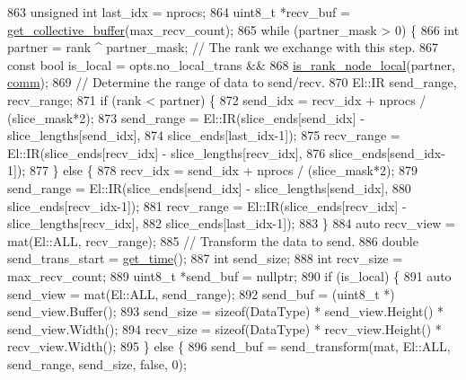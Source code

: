 \begin{DoxyCode}
863   \textcolor{keywordtype}{unsigned} \textcolor{keywordtype}{int} last\_idx = nprocs;
864   uint8\_t *recv\_buf = \hyperlink{classlbann_1_1lbann__comm_ae925ac5eaf2895717c709b252961b3bf}{get\_collective\_buffer}(max\_recv\_count);
865   \textcolor{keywordflow}{while} (partner\_mask > 0) \{
866     \textcolor{keywordtype}{int} partner = rank ^ partner\_mask;  \textcolor{comment}{// The rank we exchange with this step.}
867     \textcolor{keyword}{const} \textcolor{keywordtype}{bool} is\_local = opts.no\_local\_trans &&
868                           \hyperlink{classlbann_1_1lbann__comm_a5cdd318d1505ba0f31bf4fe9fadffacc}{is\_rank\_node\_local}(partner, \hyperlink{file__io_8cpp_ab048c6f9fcbcfaa57ce68b00263dbebe}{comm});
869     \textcolor{comment}{// Determine the range of data to send/recv.}
870     El::IR send\_range, recv\_range;
871     \textcolor{keywordflow}{if} (rank < partner) \{
872       send\_idx = recv\_idx + nprocs / (slice\_mask*2);
873       send\_range = El::IR(slice\_ends[send\_idx] - slice\_lengths[send\_idx],
874                           slice\_ends[last\_idx-1]);
875       recv\_range = El::IR(slice\_ends[recv\_idx] - slice\_lengths[recv\_idx],
876                           slice\_ends[send\_idx-1]);
877     \} \textcolor{keywordflow}{else} \{
878       recv\_idx = send\_idx + nprocs / (slice\_mask*2);
879       send\_range = El::IR(slice\_ends[send\_idx] - slice\_lengths[send\_idx],
880                           slice\_ends[recv\_idx-1]);
881       recv\_range = El::IR(slice\_ends[recv\_idx] - slice\_lengths[recv\_idx],
882                           slice\_ends[last\_idx-1]);
883     \}
884     \textcolor{keyword}{auto} recv\_view = mat(El::ALL, recv\_range);
885     \textcolor{comment}{// Transform the data to send.}
886     \textcolor{keywordtype}{double} send\_trans\_start = \hyperlink{namespacelbann_a478d36031ff0659893c4322cd856157f}{get\_time}();
887     \textcolor{keywordtype}{int} send\_size;
888     \textcolor{keywordtype}{int} recv\_size = max\_recv\_count;
889     uint8\_t *send\_buf = \textcolor{keyword}{nullptr};
890     \textcolor{keywordflow}{if} (is\_local) \{
891       \textcolor{keyword}{auto} send\_view = mat(El::ALL, send\_range);
892       send\_buf = (uint8\_t *) send\_view.Buffer();
893       send\_size = \textcolor{keyword}{sizeof}(DataType) * send\_view.Height() * send\_view.Width();
894       recv\_size = \textcolor{keyword}{sizeof}(DataType) * recv\_view.Height() * recv\_view.Width();
895     \} \textcolor{keywordflow}{else} \{
896       send\_buf = send\_transform(mat, El::ALL, send\_range, send\_size, \textcolor{keyword}{false}, 0);

\end{DoxyCode}

